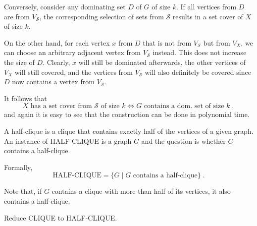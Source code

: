 \documentclass{exercise}
\begin{document}
\begin{solution}
    Conversely, consider any dominating set $D$ of $G$ of size $k$.  If all vertices
    from $D$ are from $V_{\mathcal{S}}$, the corresponding selection of sets from $\mathcal{S}$
    results in a set cover of $X$ of size $k$.
    
    On the other hand, for each vertex $x$ from $D$ that is not from $V_{\mathcal{S}}$ but
    from $V_{X}$, we can choose an arbitrary adjacent vertex from $V_{\mathcal{S}}$ instead.
    This does not increase the size of $D$.  Clearly, $x$ will still be dominated afterwards,
    the other vertices of $V_X$ will still covered, and the vertices from
    $V_{\mathcal{S}}$ will also definitely be covered since $D$ now contains a vertex from
		$V_{\mathcal{S}}$.

    It follows that
    \[ X \text{ has a set cover from } \mathcal{S} \text{ of size } k \iff G \text{ contains a dom.\ set of size } k \;, \]
    and again it is easy to see that the construction can be done in polynomial time.
  \end{solution}

\subtask A half-clique is a clique that contains exactly half of
  the vertices of a given graph.  An instance of HALF-CLIQUE is a graph $G$
  and the question is whether $G$ contains a half-clique.
  
  Formally, 
  \[ \text{HALF-CLIQUE} = \{G\mid G \text{ contains a half-clique} \}\;. \]
  
  Note that, if $G$ contains a clique with more than half of its vertices,
  it also contains a half-clique.

  Reduce CLIQUE to HALF-CLIQUE.
\end{document}
